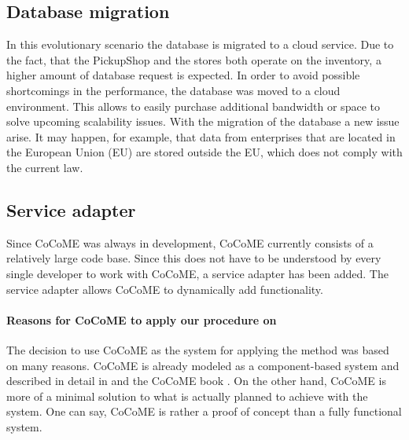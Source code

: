 \subsection{Database migration}
In this evolutionary scenario the database is migrated to a cloud service. Due to the fact, that the PickupShop and the stores both operate on the inventory, a higher amount of database request is expected. In order to avoid possible shortcomings in the performance, the database was moved to a cloud environment. This allows to easily purchase additional bandwidth or space to solve upcoming scalability issues. With the migration of the database a new issue arise. It may happen, for example, that data from enterprises that are located in the European Union (EU) are stored outside the EU, which does not comply with the current law.
\subsection{Service adapter}

Since CoCoME was always in development, CoCoME currently consists of a relatively large code base. Since this does not have to be understood by every single developer to work with CoCoME, a service adapter has been added. The service adapter allows CoCoME to dynamically add functionality.
\paragraph{Reasons for CoCoME to apply our procedure on}
The decision to use CoCoME as the system for applying the method was based on many reasons. CoCoME is already modeled as a component-based system and described in detail in \cite{CoCoMETechReport} and the CoCoME book \cite{CoCoMEBook}. 
On the other hand, CoCoME is more of a minimal solution to what is actually planned to achieve with the system. One can say, CoCoME is rather a proof of concept than a fully functional system.

